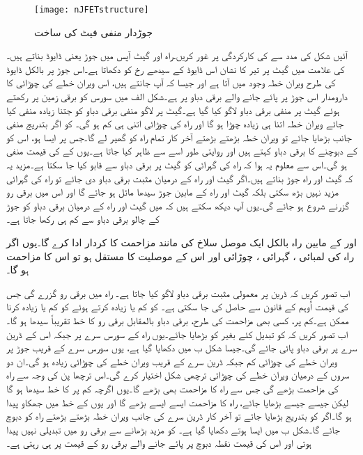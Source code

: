 \begin{figure}
\centering
\texttt{[image: nJFETstructure]}
\caption{جوڑدار منفی فیٹ کی ساخت}
\label{شکل_جوڑدار_منفی_فیٹ_ساخت}
\end{figure}
آئیں شکل  کی مدد سے  کی کارکردگی پر غور کریں۔راہ اور گیٹ آپس میں  جوڑ یعنی ڈایوڈ بناتے ہیں۔ کی علامت میں گیٹ پر تیر کا نشان اس ڈایوڈ کے سیدھے رخ کو دکھاتا ہے۔اس جوڑ پر بالکل ڈایوڈ کی طرح ویران خطہ وجود میں آتا ہے اور جیسا کہ آپ جانتے ہیں، اس ویران خطے کی چوڑائی کا دارومدار اس جوڑ پر پائے جانے والے برقی دباو پر ہے۔شکل  الف میں سورس  کو برقی زمین پر رکھتے  ہوئے گیٹ  پر منفی برقی دباو لاگو کیا گیا ہے۔گیٹ پر لاگو منفی برقی دباو کو جتنا زیادہ منفی کیا جائے ویران خطہ اتنا ہی زیادہ چوڑا ہو گا اور  راہ کی چوڑائی اتنی ہی کم ہو گی۔ کو اگر بتدریج منفی جانب بڑھایا جائے تو ویران خطہ بڑھتے بڑھتے آخر کار تمام  راہ کو گھیر لے گا۔جس  پر ایسا ہو، اس کو  کے دبوچنے کا برقی دباو کہتے ہیں اور روایتی طور اسے  سے ظاہر کیا جاتا ہے۔یوں   کے  کی قیمت منفی ہو گی۔اس سے معلوم یہ ہوا کہ راہ کی گہرائی کو گیٹ پر برقی دباو سے قابو کیا جا سکتا ہے۔مزید یہ کہ گیٹ اور راہ  جوڑ بناتے ہیں۔اگر گیٹ اور راہ کے درمیان مثبت برقی دباو دی جائے تو راہ کی گہرائی مزید نہیں بڑھ سکتی بلکہ گیٹ اور راہ کے مابین  جوڑ سیدھا مائل ہو جائے گا اور اس میں برقی رو گزرنے شروع ہو جائے گی۔یوں آپ دیکھ سکتے ہیں کہ  میں گیٹ اور راہ کے درمیان برقی دباو کو  جوڑ کے چالو برقی دباو  سے کم ہی رکھا جاتا ہے۔

 اور  کے مابین راہ بالکل ایک موصل سلاخ کی مانند مزاحمت کا کردار ادا کرے گا۔یوں اگر راہ کی لمبائی ، گہرائی ، چوڑائی  اور اس کے موصلیت کا مستقل  ہو تو اس کا مزاحمت   ہو گا۔

اب تصور کریں کہ ڈرین  پر معمولی مثبت برقی دباو  لاگو کیا جاتا ہے۔ راہ میں برقی رو  گزرے گی جس کی قیمت اُوہم کے قانون سے حاصل کی جا سکتی ہے۔ کو کم یا زیادہ کرتے ہوئے  کو کم یا زیادہ کرنا ممکن ہے۔کم  پر، کسی بھی مزاحمت کی طرح، برقی دباو بالمقابل برقی رو کا خط تقریباً سیدھا ہو گا۔اب تصور کریں کہ  کو تبدیل کئے بغیر  کو بڑھایا جائے۔یوں  راہ کے سورس سرے پر  جبکہ اس کے ڈرین سرے پر  برقی دباو پائی جائے گی۔جیسا شکل  ب میں دکھایا گیا ہے، یوں سورس سرے کے قریب  جوڑ پر ویران خطے کی چوڑائی کم جبکہ ڈرین سرے کے قریب ویران خطے کی چوڑائی زیادہ ہو گی۔ان دو سروں کے درمیان ویران خطے کی چوڑائی ترچھی شکل اختیار کرے گی۔اس ترچھا پن کی وجہ سے  راہ کی مزاحمت بڑھے گی جس سے راہ کا مزاحمت بھی بڑھے گا۔یوں اگرچہ کم  پر  کا خط سیدھا ہو گا لیکن جیسے جیسے  بڑھایا جائے، راہ کا مزاحمت ایسے ایسے بڑھے گا اور یوں  کے خط میں جھکاو پیدا ہو گا۔اگر   کو بتدریج بڑھایا جائے تو آخر کار ڈرین سرے کی جانب ویران خطہ بڑھتے بڑھتے راہ کو دبوچ جائے گا۔شکل  ب میں ایسا ہوتے دکھایا گیا ہے۔ کو مزید بڑھانے سے برقی رو میں تبدیلی نہیں پیدا ہوتی اور اس کی قیمت نقطہ دبوچ پر پائے جانے والے برقی رو کے قیمت پر ہی رہتی ہے۔

